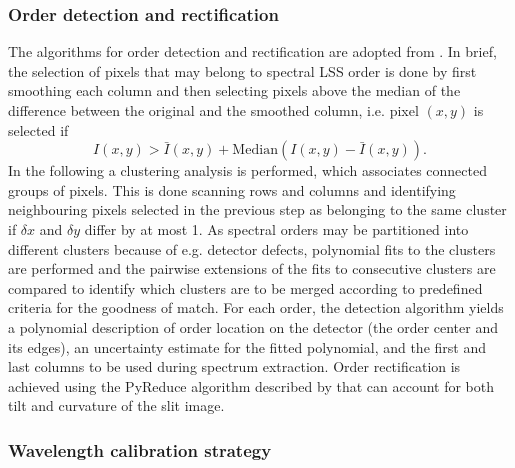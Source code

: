 \subsubsection{Order detection and rectification}\label{ssec:orderhandling}
The algorithms for order detection and rectification are adopted from \cite{pis02,pis21}.
In brief, the selection of pixels that may belong to spectral \ac{LSS} order is done by first smoothing each column and then selecting pixels above the median of the difference between the original
and the smoothed column, i.e. pixel $(x,y)$ is selected if
\begin{equation}
    I(x,y) > \bar{I}(x,y) + \mathrm{Median} ( I(x,y) - \bar{I}(x,y) ) .
\end{equation}
In the following a clustering analysis is performed, which associates connected groups of pixels. This is done scanning rows and columns and identifying neighbouring pixels selected in the previous step as belonging to the same cluster if $\delta x$ and $\delta y$ differ by at most 1. As spectral orders may be partitioned into different clusters because of e.g. detector defects, polynomial fits to the clusters are performed and the pairwise extensions of the fits to consecutive clusters are compared to identify which clusters are to be merged according to predefined criteria for the goodness of match. For each order, the detection algorithm yields a polynomial description of order location on the detector (the order center and its edges), an uncertainty estimate
for the fitted polynomial, and the first and last columns to be used during spectrum extraction. 
Order rectification is achieved using the PyReduce algorithm described by \cite{pis21} that can account for both tilt and curvature of the slit image.   

\subsubsection{Wavelength calibration strategy}\label{ssec:wavecal}
